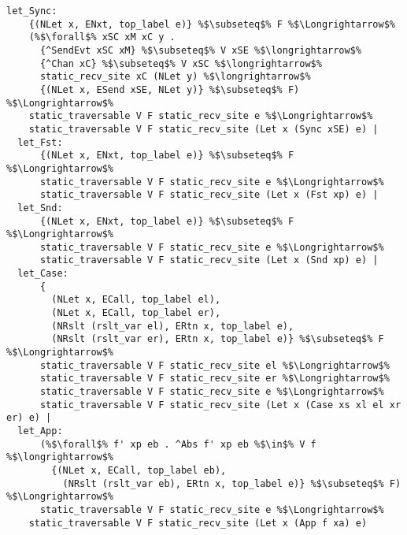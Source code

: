 \documentclass{article}
\begin{document}
\begin{lstlisting}[style=codestyle1, escapechar=\%]
  let_Sync:
    {(NLet x, ENxt, top_label e)} %$\subseteq$% F %$\Longrightarrow$%
    (%$\forall$% xSC xM xC y .
      {^SendEvt xSC xM} %$\subseteq$% V xSE %$\longrightarrow$%
      {^Chan xC} %$\subseteq$% V xSC %$\longrightarrow$%
      static_recv_site xC (NLet y) %$\longrightarrow$%
      {(NLet x, ESend xSE, NLet y)} %$\subseteq$% F) %$\Longrightarrow$%
    static_traversable V F static_recv_site e %$\Longrightarrow$%
    static_traversable V F static_recv_site (Let x (Sync xSE) e) |
  let_Fst:
      {(NLet x, ENxt, top_label e)} %$\subseteq$% F %$\Longrightarrow$%
      static_traversable V F static_recv_site e %$\Longrightarrow$%
      static_traversable V F static_recv_site (Let x (Fst xp) e) |
  let_Snd:
      {(NLet x, ENxt, top_label e)} %$\subseteq$% F %$\Longrightarrow$%
      static_traversable V F static_recv_site e %$\Longrightarrow$%
      static_traversable V F static_recv_site (Let x (Snd xp) e) |
  let_Case:
      {
        (NLet x, ECall, top_label el),
        (NLet x, ECall, top_label er),
        (NRslt (rslt_var el), ERtn x, top_label e),
        (NRslt (rslt_var er), ERtn x, top_label e)} %$\subseteq$% F %$\Longrightarrow$%
      static_traversable V F static_recv_site el %$\Longrightarrow$%
      static_traversable V F static_recv_site er %$\Longrightarrow$%
      static_traversable V F static_recv_site e %$\Longrightarrow$%
      static_traversable V F static_recv_site (Let x (Case xs xl el xr er) e) |
  let_App:
      (%$\forall$% f' xp eb . ^Abs f' xp eb %$\in$% V f %$\longrightarrow$%
        {(NLet x, ECall, top_label eb),
          (NRslt (rslt_var eb), ERtn x, top_label e)} %$\subseteq$% F) %$\Longrightarrow$%
      static_traversable V F static_recv_site e %$\Longrightarrow$%
    static_traversable V F static_recv_site (Let x (App f xa) e)

  \end{lstlisting}
\end{document}

